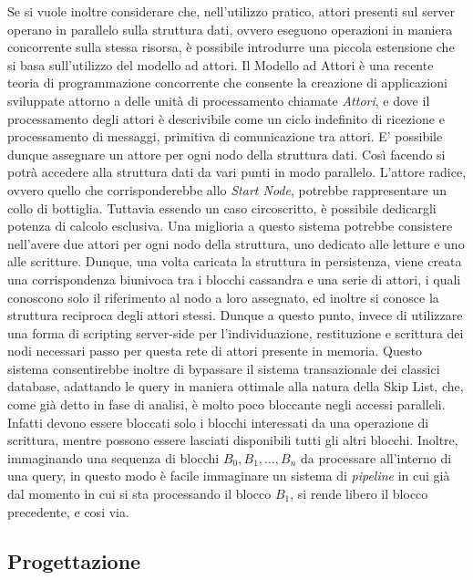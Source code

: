 		Se si vuole inoltre considerare che, nell'utilizzo pratico, attori presenti sul server operano in parallelo sulla struttura dati, ovvero eseguono operazioni in maniera concorrente sulla stessa risorsa, è possibile introdurre una piccola estensione che si basa sull'utilizzo del modello ad attori. Il Modello ad Attori è una recente teoria di programmazione concorrente che consente la creazione di applicazioni sviluppate attorno a delle unità di processamento chiamate \textit{Attori}, e dove il processamento degli attori è descrivibile come un ciclo indefinito di ricezione e processamento di messaggi, primitiva di comunicazione tra attori.
		E' possibile dunque assegnare un attore per ogni nodo della struttura dati. Così facendo si potrà accedere alla struttura dati da vari punti in modo parallelo. L'attore radice, ovvero quello che corrisponderebbe allo \textit{Start Node}, potrebbe rappresentare un collo di bottiglia. Tuttavia essendo un caso circoscritto, è possibile dedicargli potenza di calcolo esclusiva. Una miglioria a questo sistema potrebbe consistere nell'avere due attori per ogni nodo della struttura, uno dedicato alle letture e uno alle scritture.
		Dunque, una volta caricata la struttura in persistenza, viene creata una corrispondenza biunivoca tra i blocchi cassandra e una serie di attori, i quali conoscono solo il riferimento al nodo a loro assegnato, ed inoltre si conosce la struttura reciproca degli attori stessi. Dunque a questo punto, invece di utilizzare una forma di scripting server-side per l'individuazione, restituzione e scrittura dei nodi necessari passo per questa rete di attori presente in memoria.
		Questo sistema consentirebbe inoltre di bypassare il sistema transazionale dei classici database, adattando le query in maniera ottimale alla natura della Skip List, che, come già detto in fase di analisi, è molto poco bloccante negli accessi paralleli. Infatti devono essere bloccati solo i blocchi interessati da una operazione di scrittura, mentre possono essere lasciati disponibili tutti gli altri blocchi. Inoltre, immaginando una sequenza di blocchi $ B_{0}, B_{1}, ..., B_{n} $ da processare all'interno di una query, in questo modo è facile immaginare un sistema di \textit{pipeline} in cui già dal momento in cui si sta processando il blocco $ B_{1} $, si rende libero il blocco precedente, e cosi via.

	\subsection{Progettazione}

